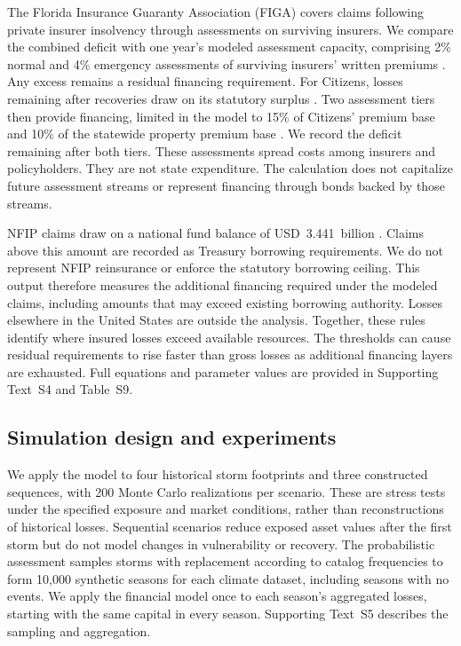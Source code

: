 The Florida Insurance Guaranty Association (FIGA) covers claims following private insurer insolvency through assessments on surviving insurers. We compare the combined deficit with one year's modeled assessment capacity, comprising 2\% normal and 4\% emergency assessments of surviving insurers' written premiums \cite{flastat,figa_assessments}. Any excess remains a residual financing requirement. For Citizens, losses remaining after recoveries draw on its statutory surplus \cite{citizens_annual_statement_2024}. Two assessment tiers then provide financing, limited in the model to 15\% of Citizens' premium base and 10\% of the statewide property premium base \cite{citizens_assessments}. We record the deficit remaining after both tiers. These assessments spread costs among insurers and policyholders. They are not state expenditure. The calculation does not capitalize future assessment streams or represent financing through bonds backed by those streams.

NFIP claims draw on a national fund balance of USD~3.441~billion \cite{crs_nfip_fund_balance_2025}. Claims above this amount are recorded as Treasury borrowing requirements. We do not represent NFIP reinsurance or enforce the statutory borrowing ceiling. This output therefore measures the additional financing required under the modeled claims, including amounts that may exceed existing borrowing authority. Losses elsewhere in the United States are outside the analysis. Together, these rules identify where insured losses exceed available resources. The thresholds can cause residual requirements to rise faster than gross losses as additional financing layers are exhausted. Full equations and parameter values are provided in Supporting Text~S4 and Table~S9.

\subsection{Simulation design and experiments}\label{MethodsFutureClim}\label{MethodsPolicy}\label{MethodsBuildingCodeClimate}
We apply the model to four historical storm footprints and three constructed sequences, with 200 Monte Carlo realizations per scenario. These are stress tests under the specified exposure and market conditions, rather than reconstructions of historical losses. Sequential scenarios reduce exposed asset values after the first storm but do not model changes in vulnerability or recovery. The probabilistic assessment samples storms with replacement according to catalog frequencies to form 10,000 synthetic seasons for each climate dataset, including seasons with no events. We apply the financial model once to each season's aggregated losses, starting with the same capital in every season. Supporting Text~S5 describes the sampling and aggregation.

